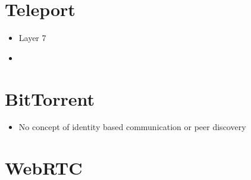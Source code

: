 \hypertarget{notes__02150-teleport.md}{}
\hypertarget{notes__02150-teleport.md__teleport}{%
\section{Teleport}\label{notes__02150-teleport.md__teleport}}

\begin{itemize}
\tightlist
\item
  Layer 7
\item
\end{itemize}

\hypertarget{notes__02160-bittorrent.md}{}
\hypertarget{notes__02160-bittorrent.md__bittorrent}{%
\section{BitTorrent}\label{notes__02160-bittorrent.md__bittorrent}}

\begin{itemize}
\tightlist
\item
  No concept of identity based communication or peer discovery
\end{itemize}

\hypertarget{notes__02170-webrtc.md}{}
\hypertarget{notes__02170-webrtc.md__webrtc}{%
\section{WebRTC}\label{notes__02170-webrtc.md__webrtc}}

